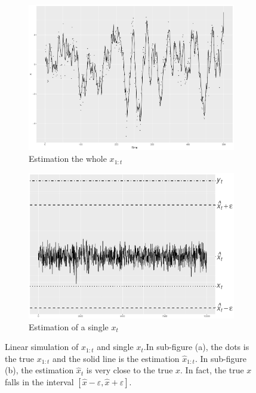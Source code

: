\begin{figure}[h]
\centering
\begin{subfigure}[b]{0.45\textwidth}
    \includegraphics[width=\textwidth]{Chapters/05MCMCOU/plots/linearsimuXall.pdf}
     \caption{Estimation the whole $x_{1:t}$}
\end{subfigure}
\begin{subfigure}[b]{0.45\textwidth}
	\includegraphics[width=\textwidth]{Chapters/05MCMCOU/plots/gglinearestXt2.pdf}
     \caption{Estimation of a single $x_t$}
\end{subfigure}
\caption{Linear simulation of $x_{1:t}$ and single $x_t$.In sub-figure (a), the dots is the true $x_{1:t}$ and the solid line is the estimation $\hat{x}_{1:t}$. In sub-figure (b), the estimation $\hat{x}_t$ is very close to the true $x$. In fact, the true $x$ falls in the interval $[\hat{x}-\varepsilon,\hat{x}+\varepsilon]$.}
\label{linearmarginXt}
\end{figure}



